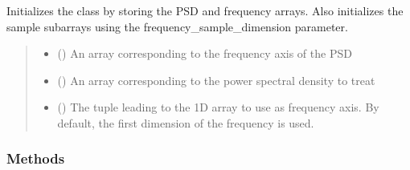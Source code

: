 \documentclass[letterpaper,10pt,english]{sphinxmanual}
\begin{document}
\begin{fulllineitems}
\begin{fulllineitems}
\label{\detokenize{source/_autosummary/HDF5_BLS_treat.Treat_backend:HDF5_BLS_treat.Treat_backend.__init__}}
\pysigstartsignatures
\pysiglinewithargsret
{}
{\sphinxparamcomma {}\sphinxparamcomma {}}
{}
\pysigstopsignatures
\sphinxAtStartPar
Initializes the class by storing the PSD and frequency arrays. Also initializes the sample sub\sphinxhyphen{}arrays using the frequency\_sample\_dimension parameter.
\begin{quote}\begin{description}
\begin{itemize}
\item {} 
\sphinxAtStartPar
{} () \textendash{} An array corresponding to the frequency axis of the PSD

\item {} 
\sphinxAtStartPar
{} () \textendash{} An array corresponding to the power spectral density to treat

\item {} 
\sphinxAtStartPar
{} (\sphinxstyleliteralemphasis{\sphinxupquote{, }}) \textendash{} The tuple leading to the 1\sphinxhyphen{}D array to use as frequency axis. By default, the first dimension of the frequency is used.

\end{itemize}

\end{description}\end{quote}

\end{fulllineitems}

\subsubsection*{Methods}



\end{fulllineitems}
\end{document}
